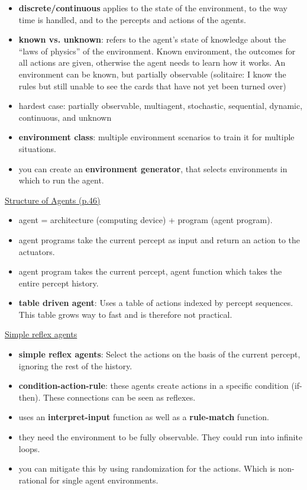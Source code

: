 \begin{itemize}[noitemsep,nolistsep]
	\item \textbf{discrete/continuous} applies to the state of the environment, to the way time is handled, and to the percepts and actions of the agents.
	\item \textbf{known vs. unknown}: refers to the agent’s state of knowledge about the “laws of physics” of the environment. Known environment, the outcomes for all actions are given, otherwise the agent needs to learn how it works. An environment can be known, but partially observable (solitaire: I know the rules but still unable to see the cards that have not yet been turned over)
	\item hardest case: partially observable, multiagent, stochastic, sequential, dynamic, continuous, and unknown
	\item \textbf{environment class}: multiple environment scenarios to train it for multiple situations.
	\item you can create an \textbf{environment generator}, that selects environments in which to run the agent.
\end{itemize}

\underline{Structure of Agents (p.46)}
\begin{itemize}[noitemsep,nolistsep]
	\item agent = architecture (computing device) + program (agent program).
	\item agent programs take the current percept as input and return an action to the actuators.
	\item agent program takes the current percept, agent function which takes the entire percept history.
	\item \textbf{table driven agent}: Uses a table of actions indexed by percept sequences. This table grows way to fast and is therefore not practical.
\end{itemize}

\underline{Simple reflex agents}
\begin{itemize}[noitemsep,nolistsep]
	\item \textbf{simple reflex agents}: Select the actions on the basis of the current percept, ignoring the rest of the history.
	\item \textbf{condition-action-rule}: these agents create actions in a specific condition (if-then). These connections can be seen as reflexes.
	\item uses an \textbf{interpret-input} function as well as a \textbf{rule-match} function.
	\item they need the environment to be fully observable. They could run into infinite loops.
	\item you can mitigate this by using randomization for the actions. Which is non-rational for single agent environments.
\end{itemize}

